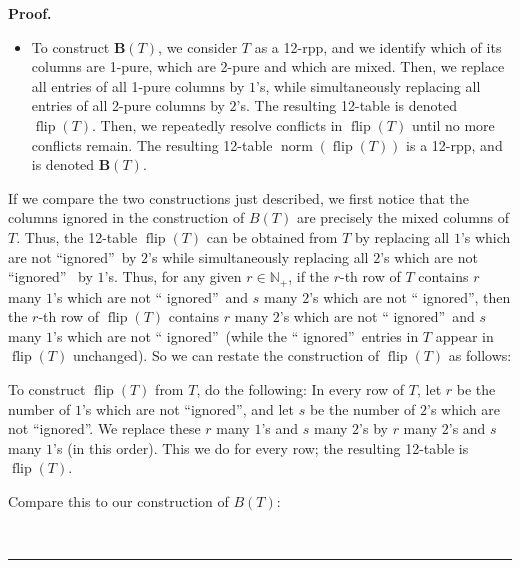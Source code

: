 \documentclass[numbers=enddot,12pt,final,onecolumn,notitlepage]{scrartcl}%
\theoremstyle{definition}
\newenvironment{proof}[1][Proof]{\noindent\textbf{#1.} }{\ \rule{0.5em}{0.5em}}
\begin{document}
\begin{proof}
\begin{itemize}
\item To construct $\mathbf{B}\left(  T\right)  $, we consider $T$ as a
12-rpp, and we identify which of its columns are 1-pure, which are 2-pure and
which are mixed. Then, we replace all entries of all 1-pure columns by $1$'s,
while simultaneously replacing all entries of all 2-pure columns by $2$'s. The
resulting 12-table is denoted $\operatorname*{flip}\left(  T\right)  $. Then,
we repeatedly resolve conflicts in $\operatorname*{flip}\left(  T\right)  $
until no more conflicts remain. The resulting 12-table $\operatorname*{norm}%
\left(  \operatorname*{flip}\left(  T\right)  \right)  $ is a 12-rpp, and is
denoted $\mathbf{B}\left(  T\right)  $.
\end{itemize}

If we compare the two constructions just described, we first notice that the
columns ignored in the construction of $B\left(  T\right)  $ are precisely the
mixed columns of $T$. Thus, the 12-table $\operatorname*{flip}\left(
T\right)  $ can be obtained from $T$ by replacing all $1$'s which are not
\textquotedblleft ignored\textquotedblright\ by $2$'s while simultaneously
replacing all $2$'s which are not \textquotedblleft ignored\textquotedblright%
\ by $1$'s. Thus, for any given $r\in\mathbb{N}_{+}$, if the $r$-th row of $T$
contains $r$ many $1$'s which are not \textquotedblleft
ignored\textquotedblright\ and $s$ many $2$'s which are not \textquotedblleft
ignored\textquotedblright, then the $r$-th row of $\operatorname*{flip}\left(
T\right)  $ contains $r$ many $2$'s which are not \textquotedblleft
ignored\textquotedblright\ and $s$ many $1$'s which are not \textquotedblleft
ignored\textquotedblright\ (while the \textquotedblleft
ignored\textquotedblright\ entries in $T$ appear in $\operatorname*{flip}%
\left(  T\right)  $ unchanged). So we can restate the construction of
$\operatorname*{flip}\left(  T\right)  $ as follows:

To construct $\operatorname*{flip}\left(  T\right)  $ from $T$, do the
following: In every row of $T$, let $r$ be the number of $1$'s which are not
\textquotedblleft ignored\textquotedblright, and let $s$ be the number of
$2$'s which are not \textquotedblleft ignored\textquotedblright. We replace
these $r$ many $1$'s and $s$ many $2$'s by $r$ many $2$'s and $s$ many $1$'s
(in this order). This we do for every row; the resulting 12-table is
$\operatorname*{flip}\left(  T\right)  $.

Compare this to our construction of $B\left(  T\right)  $:


\end{proof}
\end{document}
